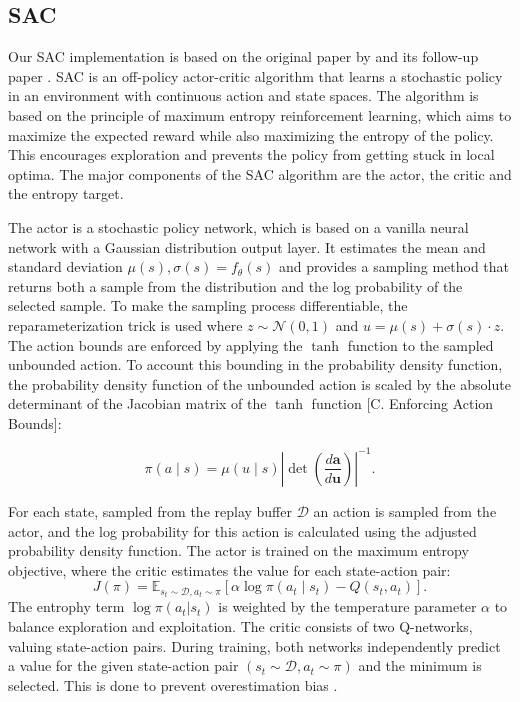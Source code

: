 \subsection{\acl{SAC}}\label{sec:sac}
Our \ac{SAC} implementation is based on the original paper by \cite{HaarnojaAbbeelLevine2018:SAC} and its follow-up paper \cite{haarnoja2019softactorcriticalgorithmsapplications}.
\ac{SAC} is an off-policy actor-critic algorithm that learns a stochastic policy in an environment with continuous action and state spaces.
The algorithm is based on the principle of maximum entropy reinforcement learning, which aims to maximize the expected reward while also maximizing the entropy of the policy. This encourages exploration and prevents the policy from getting stuck in local optima.
The major components of the \ac{SAC} algorithm are the actor, the critic and the entropy target.


The actor is a stochastic policy network, which is based on a vanilla neural network with a Gaussian distribution output layer.
It estimates the mean and standard deviation $\mu(s), \sigma(s) = f_\theta(s)$ and provides a sampling method that returns
both a sample from the distribution and the log probability of the selected sample.
To make the sampling process differentiable, the reparameterization trick is used where $z \sim \mathcal{N}(0,1)$ and $u = \mu(s) + \sigma(s) \cdot z$.
The action bounds are enforced by applying the $\tanh$ function to the sampled unbounded action.
To account this bounding in the probability density function,
the probability density function of the unbounded action is scaled by the absolute determinant of the Jacobian matrix of the $\tanh$ function  \cite{fujimoto2018:TD3}[C. Enforcing Action Bounds]:


\begin{equation}
    \pi(a \mid s) = \mu(u \mid s) \left| \det \left( \frac{d\mathbf{a}}{d\mathbf{u}} \right) \right|^{-1}.
\end{equation}

For each state, sampled from the replay buffer \( \mathcal{D} \) an action is sampled from the actor, and the log probability for this action is calculated using the adjusted probability density function.
The actor is trained on the maximum entropy objective, where the critic estimates the value for each state-action pair:
\begin{equation}
    J(\pi) = \mathbb{E}_{s_t \sim \mathcal{D}, a_t \sim \pi} \left[ \alpha \log \pi(a_t \mid s_t) - Q(s_t, a_t) \right].
\end{equation}
The entrophy term $\log \pi(a_t|s_t)$ is weighted by the temperature parameter \( \alpha \) to balance exploration and exploitation. The critic consists of two Q-networks, valuing state-action pairs.
During training, both networks independently predict a value for the given state-action pair $(s_t\sim \mathcal{D}, a_t \sim \pi)$ and the minimum is selected. This is done to prevent overestimation bias \cite{fujimoto2018addressingfunctionapproximationerror}.


